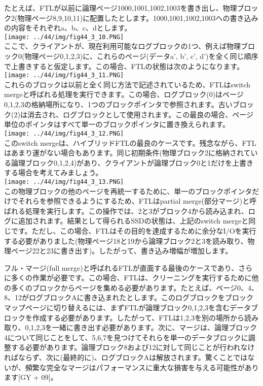 たとえば、FTLが以前に論理ページ1000,1001,1002,1003を書き出し、物理ブロック2(物理ページ8,9,10,11)に配置したとします。1000,1001,1002,1003への書き込みの内容をそれぞれa、b、c、dとします。\\
\texttt{[image: ../44/img/fig44\_3\_10.PNG]}\\
ここで、クライアントが、現在利用可能なログブロックの1つ、例えば物理ブロック0(物理ページ0,1,2,3)に、これらのページ(データa',
b', c',
d')を全く同じ順序で上書きすると仮定します。この場合、FTLの状態は次のようになります。\\
\texttt{[image: ../44/img/fig44\_3\_11.PNG]}\\
これらのブロックは以前と全く同じ方法で記述されているため、FTLはswitch
mergeと呼ばれる処理を実行できます。この場合、ログブロック(0)はページ0,1,2,3の格納場所になり、1つのブロックポインタで参照されます。古いブロック(2)は消去され、ログブロックとして使用されます。この最良の場合、ページ単位のポインタはすべて単一のブロックポインタに置き換えられます。\\
\texttt{[image: ../44/img/fig44\_3\_12.PNG]}\\
このswitch
mergeは、ハイブリッドFTLの最良のケースです。残念ながら、FTLはあまり運がない場合もあります。同じ初期条件(物理ブロック2に格納されている論理ブロック0,1,2,4)があり、クライアントが論理ブロック0と1だけを上書きする場合を考えてみましょう。\\
\texttt{[image: ../44/img/fig44\_3\_13.PNG]}\\
この物理ブロックの他のページを再統一するために、単一のブロックポインタだけでそれらを参照できるようにするため、FTLはpartial
merge(部分マージ)と呼ばれる処理を実行します。この操作では、2と3がブロック4から読み込まれ、ログに追加されます。結果として得られるSSDの状態は、上記のswitch
mergeと同じです。ただし、この場合、FTLはその目的を達成するために余分なI/Oを実行する必要がありました(物理ページ18と19から論理ブロック2と3を読み取り、物理ページ22と23に書き出す)。したがって、書き込み増幅が増加します。

フル・マージ(full
merge)と呼ばれるFTLが直面する最後のケースであり、さらに多くの作業が必要です。この場合、FTLは、クリーニングを実行するために他の多くのブロックからページを集める必要があります。たとえば、ページ0、4、8、12がログブロックAに書き込まれたとします。このログブロックをブロックマップページに切り替えるには、まずFTLが論理ブロック0,1,2,3を含むデータブロックを作成する必要があります。したがって、FTLは1,2,3を別の場所から読み取り、0,1,2,3を一緒に書き出す必要があります。次に、マージは、論理ブロック4について同じことをして、5,6,7を見つけてそれらを単一のデータブロックに調整する必要があります。論理ブロック8および12に対して同じことが行われなければならず、次に(最終的に)、ログブロックAは解放されます。驚くことではないが、頻繁な完全なマージはパフォーマンスに重大な損害を与える可能性があります{[}GY
+ 09{]}。

